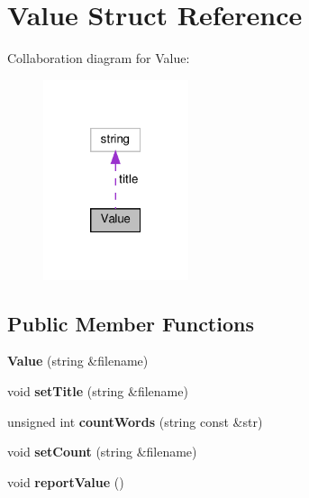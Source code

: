 \hypertarget{structValue}{}\section{Value Struct Reference}
\label{structValue}


Collaboration diagram for Value\+:\nopagebreak
\begin{figure}[H]
\begin{center}
\leavevmode
\includegraphics[width=121pt]{structValue__coll__graph}
\end{center}
\end{figure}
\subsection*{Public Member Functions}
\begin{DoxyCompactItemize}
\item 
\mbox{\label{structValue_ab62780d112b99503bb67b5b4220a54b8}} 
{\bfseries Value} (string \&filename)
\item 
\mbox{\label{structValue_a12f446c1de93ebcffa83b792434a6d45}} 
void {\bfseries set\+Title} (string \&filename)
\item 
\mbox{\label{structValue_abcfa5f07be1a11fc23cb77ed38361c60}} 
unsigned int {\bfseries count\+Words} (string const \&str)
\item 
\mbox{\label{structValue_a9750bd014214587c5adeb7af03c3e844}} 
void {\bfseries set\+Count} (string \&filename)
\item 
\mbox{\label{structValue_a9a07ab329fd770cda9a615dfa3387ebf}} 
void {\bfseries report\+Value} ()
\end{DoxyCompactItemize}
